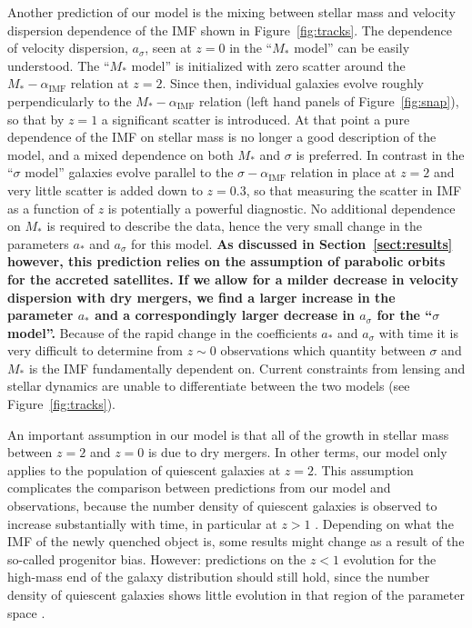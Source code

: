 \documentclass[usenatbib, letters]{mnras}
\def\aimf{\alpha_{\mathrm{IMF}}}
\def\Sref#1{Section~\ref{#1}\xspace}
\def\Fref#1{Figure~\ref{#1}\xspace}
\begin{document}
Another prediction of our model is the mixing between stellar mass and velocity dispersion dependence of the IMF shown in \Fref{fig:tracks}.
The dependence of velocity dispersion, $a_\sigma$, seen at $z=0$ in the ``$M_*$ model'' can be easily understood. 
The ``$M_*$ model'' is initialized with zero scatter around the $M_*-\aimf$ relation at $z=2$.
Since then, individual galaxies evolve roughly perpendicularly to the $M_*-\aimf$ relation (left hand panels of \Fref{fig:snap}), so that by $z=1$ a significant scatter is introduced. At that point a pure dependence of the IMF on stellar mass is no longer a good description of the model, and a mixed dependence on both $M_*$ and $\sigma$ is preferred.
In contrast in the ``$\sigma$ model'' galaxies evolve parallel to the $\sigma-\aimf$ relation in place at $z=2$ and very little scatter is added down to $z=0.3$, so that measuring the scatter in IMF as a function of $z$ is potentially a powerful diagnostic. No additional dependence on $M_*$ is required to describe the data, hence the very small change in the parameters $a_*$ and $a_\sigma$ for this model.
{\bf As discussed in \Sref{sect:results} however, this prediction relies on the assumption of parabolic orbits for the accreted satellites. If we allow for a milder decrease in velocity dispersion with dry mergers, we find a larger increase in the parameter $a_*$ and a correspondingly larger decrease in $a_\sigma$ for the ``$\sigma$ model''.}
Because of the rapid change in the coefficients $a_*$ and $a_\sigma$ with time it is very difficult to determine from $z\sim0$ observations which quantity between $\sigma$ and $M_*$ is the IMF fundamentally dependent on. Current constraints from lensing and stellar dynamics are unable to differentiate between the two models (see \Fref{fig:tracks}).

An important assumption in our model is that all of the growth in stellar mass between $z=2$ and $z=0$ is due to dry mergers. In other terms, our model only applies to the population of quiescent galaxies at $z=2$. This assumption complicates the comparison between predictions from our model and observations, because the number density of quiescent galaxies is observed to increase substantially with time, in particular at $z>1$ \citep[e.g.][]{Ilb++13, Cas++13}. Depending on what the IMF of the newly quenched object is, some results might change as a result of the so-called progenitor bias. However: predictions on the $z<1$ evolution for the high-mass end of the galaxy distribution should still hold, since the number density of quiescent galaxies shows little evolution in that region of the parameter space \citep{Lop++12}.
\end{document}
